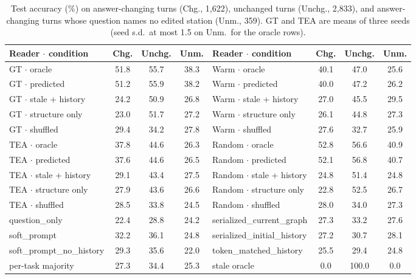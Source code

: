 \documentclass[11pt]{article}
\begin{document}
\begin{table}[t]
\centering
\small
\begin{tabular}{@{}lccc|lccc@{}}
\toprule
\textbf{Reader $\cdot$ condition} & \textbf{Chg.} & \textbf{Unchg.} & \textbf{Unm.} & \textbf{Reader $\cdot$ condition} & \textbf{Chg.} & \textbf{Unchg.} & \textbf{Unm.} \\
\midrule
GT $\cdot$ oracle & 51.8 & 55.7 & 38.3 & Warm $\cdot$ oracle & 40.1 & 47.0 & 25.6 \\
GT $\cdot$ predicted & 51.2 & 55.9 & 38.2 & Warm $\cdot$ predicted & 40.0 & 47.2 & 26.2 \\
GT $\cdot$ stale + history & 24.2 & 50.9 & 26.8 & Warm $\cdot$ stale + history & 27.0 & 45.5 & 29.5 \\
GT $\cdot$ structure only & 23.0 & 51.7 & 27.2 & Warm $\cdot$ structure only & 26.1 & 44.8 & 27.3 \\
GT $\cdot$ shuffled & 29.4 & 34.2 & 27.8 & Warm $\cdot$ shuffled & 27.6 & 32.7 & 25.9 \\
TEA $\cdot$ oracle & 37.8 & 44.6 & 26.3 & Random $\cdot$ oracle & 52.8 & 56.6 & 40.9 \\
TEA $\cdot$ predicted & 37.6 & 44.6 & 26.5 & Random $\cdot$ predicted & 52.1 & 56.8 & 40.7 \\
TEA $\cdot$ stale + history & 29.1 & 43.4 & 27.5 & Random $\cdot$ stale + history & 24.8 & 51.4 & 24.8 \\
TEA $\cdot$ structure only & 27.9 & 43.6 & 26.6 & Random $\cdot$ structure only & 22.8 & 52.5 & 26.7 \\
TEA $\cdot$ shuffled & 28.5 & 33.8 & 24.5 & Random $\cdot$ shuffled & 28.0 & 34.0 & 27.3 \\
\midrule
question\_only & 22.4 & 28.8 & 24.2 & serialized\_current\_graph & 27.3 & 33.2 & 27.6 \\
soft\_prompt & 32.2 & 36.1 & 24.8 & serialized\_initial\_history & 27.2 & 30.7 & 28.1 \\
soft\_prompt\_no\_history & 29.3 & 35.6 & 22.0 & token\_matched\_history & 25.5 & 29.4 & 24.8 \\
per-task majority & 27.3 & 34.4 & 25.3 & stale oracle & 0.0 & 100.0 & 0.0 \\
\bottomrule
\end{tabular}
\caption{Test accuracy (\%) on answer-changing turns (Chg., 1{,}622), unchanged turns (Unchg., 2{,}833), and answer-changing turns whose question names no edited station (Unm., 359). GT and TEA are means of three seeds (seed s.d.\ at most 1.5 on Unm.\ for the oracle rows).}
\label{tab:changing-full}
\end{table}
\end{document}
